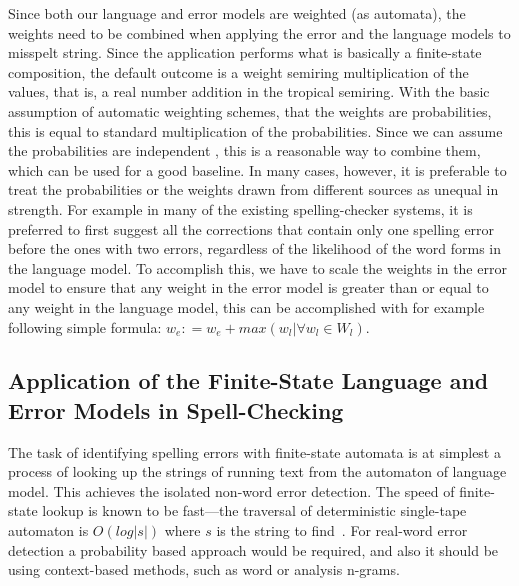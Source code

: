 \documentclass[a4paper,12pt]{article}
\begin{document}
Since both our language and error models are weighted (as automata), the
weights need to be combined when applying the error and the language models to
misspelt string. Since the application performs what is basically a
finite-state composition, the default outcome is a weight semiring
multiplication of the values, that is, a real number addition in the tropical
semiring. With the basic assumption of automatic weighting schemes, that the
weights are probabilities, this is equal to standard multiplication of the
probabilities. Since we can assume the probabilities are independent
\cite[]{church1991probability}, this is a reasonable way to combine them, which
can be used for a good baseline. In many cases, however, it is preferable to
treat the probabilities or the weights drawn from different sources as unequal
in strength. For example in many of the existing spelling-checker systems, it
is preferred to first suggest all the corrections that contain only one
spelling error before the ones  with two errors, regardless of the likelihood
of the word forms in the language model. To accomplish this, we have to scale
the weights in the error model to ensure that any weight in the error model is
greater than or equal to any weight in the language model, this can be
accomplished with for example following simple formula: $w_e
\mathrel{\mathop:}= w_e + max(w_l | \forall w_l \in W_l)$.

\subsection{Application of the Finite-State Language and Error Models in
Spell-Checking}

The task of identifying spelling errors with finite-state automata is at
simplest a process of looking up the strings of running text from the automaton
of language model. This achieves the isolated non-word error detection. The
speed of finite-state lookup is known to be fast---the traversal of
deterministic single-tape automaton is $O(log |s|)$ where $s$ is the string to
find~\cite{aho2007compilers}.  For real-word error detection a probability
based approach would be required, and also it should be using context-based
methods, such as word or analysis n-grams.
\end{document}
